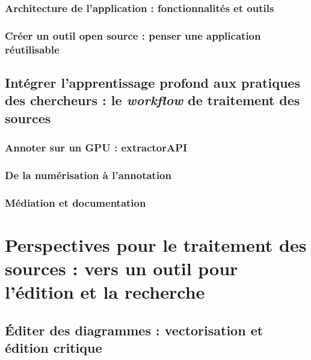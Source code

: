 \documentclass[a4paper,12pt,twoside]{book}
\newcommand{\clearemptydoublepage}{\newpage{\pagestyle{empty}\cleardoublepage}}
\begin{document}
                \section[Architecture de l’application]{Architecture de l’application : fonctionnalités et outils}
                    
                    
                \section{Créer un outil open source : penser une application réutilisable}
            		
            
        \clearemptydoublepage
        
        \chapter[\textit{Deep learning} et pratiques des chercheurs]{Intégrer l’apprentissage profond aux pratiques des chercheurs : le \textit{workflow} de traitement des sources}
                \section{Annoter sur un GPU : extractorAPI}
                    
            
                \section{De la numérisation à l’annotation}
                    
             
                \section{Médiation et documentation}
                    
            
        \clearemptydoublepage

    \part{Perspectives pour le traitement des sources : vers un outil pour l’édition et la recherche}
        \chapter[Éditer des diagrammes]{Éditer des diagrammes : vectorisation et édition critique}
\end{document}
